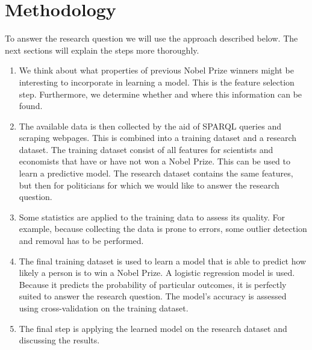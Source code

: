 \section{Methodology}
\label{sec:methodology}
To answer the research question we will use the approach described below. The next sections will explain the steps more thoroughly.
\begin{enumerate}
\item We think about what properties of previous Nobel Prize winners might be interesting to incorporate in learning a model. This is the feature selection step. Furthermore, we determine whether and where this information can be found.
\item The available data is then collected by the aid of SPARQL queries and scraping webpages. This is combined into a training dataset and a research dataset. The training dataset consist of all features for scientists and economists that have or have not won a Nobel Prize. This can be used to learn a predictive model. The research dataset contains the same features, but then for politicians for which we would like to answer the research question.
\item Some statistics are applied to the training data to assess its quality. For example, because collecting the data is prone to errors, some outlier detection and removal has to be performed.
\item The final training dataset is used to learn a model that is able to predict how likely a person is to win a Nobel Prize. A logistic regression model is used. Because it predicts the probability of particular outcomes, it is perfectly suited to answer the research question. The model's accuracy is assessed using cross-validation on the training dataset.
\item The final step is applying the learned model on the research dataset and discussing the results. 
\end{enumerate}
